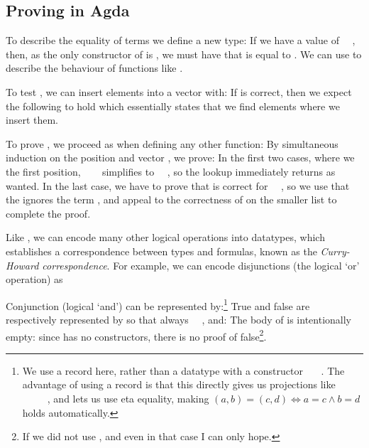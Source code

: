 \subsection{Proving in Agda}\label{sec:background-proving}
To describe the equality of terms we define a new type:
If we have a value  of \ \ , then, as the only constructor of  is , we must have that  is equal to . We can use  to describe the behaviour of functions like .

To test , we can insert elements into a vector with:
If  is correct, then we expect the following to hold
which essentially states that we find elements where we insert them.

To prove , we proceed as when defining any other function: By simultaneous induction on the position  and vector , we prove:
In the first two cases, where we  the first position, \ \ \  simplifies to \ \ , so the lookup immediately returns  as wanted. In the last case, we have to prove that  is correct for \ \ , so we use that the  ignores the term , and appeal to the correctness of  on the smaller list  to complete the proof.

Like , we can encode many other logical operations into datatypes, which establishes a correspondence between types and formulas, known as the \emph{Curry-Howard correspondence}. For example, we can encode disjunctions (the logical `or' operation) as

Conjunction (logical `and') can be represented by:\footnote{We use a record here, rather than a datatype with a constructor \ \ \ . The advantage of using a record is that this directly gives us projections like \ \AV{:}\ \ \ \ , and lets us use eta equality, making $(a, b) = (c , d) \iff a = c \land b = d$ holds automatically.}
True and false are respectively represented by
so that always \ \AV{:}\ , and:
The body of  is intentionally empty: since  has no constructors, there is no proof of false\footnote{If we did not use , and even in that case I can only hope.}.

